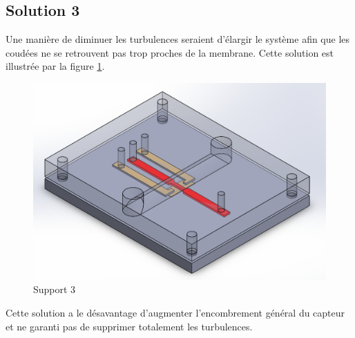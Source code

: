 \subsection{Solution 3}
Une manière de diminuer les turbulences seraient d'élargir le système afin que les coudées ne se retrouvent pas trop proches de la
membrane. Cette solution est illustrée par la figure \ref{fig:solution3}. 

\begin{figure}[H]
    \centering
    \includegraphics[scale = 0.3]{images/Design4}
    \caption{Support 3}
    \label{fig:solution3}
\end{figure}
Cette solution a le désavantage d'augmenter l'encombrement général du capteur et ne garanti pas de supprimer totalement les turbulences. 

